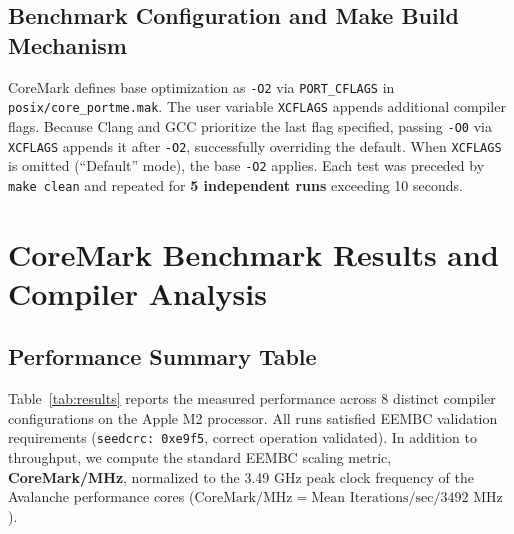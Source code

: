 \documentclass[11pt,a4paper]{article}
\begin{document}
\subsection{Benchmark Configuration and Make Build Mechanism}
CoreMark defines base optimization as \texttt{-O2} via \texttt{PORT\_CFLAGS} in \texttt{posix/}\allowbreak\texttt{core\_portme.mak}. The user variable \texttt{XCFLAGS} appends additional compiler flags. Because Clang and GCC prioritize the last flag specified, passing \texttt{-O0} via \texttt{XCFLAGS} appends it after \texttt{-O2}, successfully overriding the default. When \texttt{XCFLAGS} is omitted (``Default'' mode), the base \texttt{-O2} applies. Each test was preceded by \texttt{make clean} and repeated for \textbf{5 independent runs} exceeding 10 seconds.



\section{CoreMark Benchmark Results and Compiler Analysis}

\subsection{Performance Summary Table}
Table~\ref{tab:results} reports the measured performance across 8 distinct compiler configurations on the Apple M2 processor. All runs satisfied EEMBC validation requirements (\texttt{seedcrc: 0xe9f5}, correct operation validated). In addition to throughput, we compute the standard EEMBC scaling metric, \textbf{CoreMark/MHz}, normalized to the 3.49 GHz peak clock frequency of the Avalanche performance cores ($\text{CoreMark/MHz} = \text{Mean Iterations/sec} / 3492\text{ MHz}$).
\end{document}

